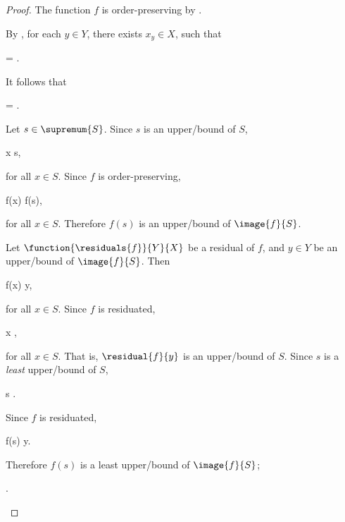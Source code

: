 \documentclass[b5paper, english, oneside]{memoir}
\begin{document}
\begin{proof}
The function $f$ is order-preserving by .

By , for each $y \in Y$, there exists $x_y \in X$, such that
\begin{eqs}
 = .
\end{eqs}
It follows that
\begin{eqs}
 =  \neq \emptyset.
\end{eqs}

Let $s \in \supremum{S}$. Since $s$ is an upper\-/bound of $S$,
\begin{eqs}
x \preleq s,
\end{eqs}
for all $x \in S$. Since $f$ is order-preserving,
\begin{eqs}
f(x) \preleqb f(s),
\end{eqs}
for all $x \in S$. Therefore $f(s)$ is an upper\-/bound of $\image{f}{S}$.

Let $\function{\residuals{f}}{Y}{X}$ be a residual of $f$, and $y \in Y$ be an upper\-/bound of $\image{f}{S}$. Then
\begin{eqs}
f(x) \preleqb y,
\end{eqs}
for all $x \in S$. Since $f$ is residuated,
\begin{eqs}
x \preleq {},
\end{eqs}
for all $x \in S$. That is, $\residual{f}{y}$ is an upper\-/bound of $S$. Since $s$ is a \emph{least} upper\-/bound of $S$,
\begin{eqs}
s \preleq {}.
\end{eqs}
Since $f$ is residuated,
\begin{eqs}
f(s) \preleqb y.
\end{eqs}
Therefore $f(s)$ is a least upper\-/bound of $\image{f}{S}$;
\begin{eqs}
 \subset {}.
\end{eqs}


\end{proof}
\end{document}
